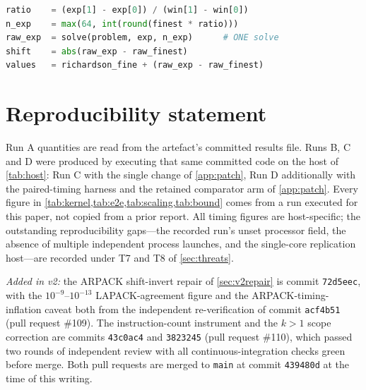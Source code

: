 \documentclass[twocolumn,10pt,a4paper]{article}
\theoremstyle{plain}
\theoremstyle{definition}
\begin{document}
\begin{lstlisting}[language=Python]
ratio    = (exp[1] - exp[0]) / (win[1] - win[0])
n_exp    = max(64, int(round(finest * ratio)))
raw_exp  = solve(problem, exp, n_exp)      # ONE solve
shift    = abs(raw_exp - raw_finest)
values   = richardson_fine + (raw_exp - raw_finest)
\end{lstlisting}

\section*{Reproducibility statement}
Run A quantities are read from the artefact's committed results file. Runs B,
C and D were produced by executing that same committed code on the host of
\cref{tab:host}: Run C with the single change of \cref{app:patch}, Run D
additionally with the paired-timing harness and the retained comparator arm of
\cref{app:patch}. Every figure in \cref{tab:kernel,tab:e2e,tab:scaling,tab:bound}
comes from a run executed for this paper, not copied from a prior report. All timing
figures are host-specific; the outstanding reproducibility gaps---the recorded
run's unset processor field, the absence of multiple independent process
launches, and the single-core replication host---are recorded under T7 and T8 of
\cref{sec:threats}.

\emph{Added in v2:} the ARPACK shift-invert repair of \cref{sec:v2repair} is
commit \texttt{72d5eec}, with the $10^{-9}$--$10^{-13}$ LAPACK-agreement
figure and the ARPACK-timing-inflation caveat both from the independent
re-verification of commit \texttt{acf4b51} (pull request \#109). The
instruction-count instrument and the $k>1$ scope correction are commits
\texttt{43c0ac4} and \texttt{3823245} (pull request \#110), which passed two
rounds of independent review with all continuous-integration checks green
before merge. Both pull requests are merged to \texttt{main} at commit
\texttt{439480d} at the time of this writing.
\end{document}
